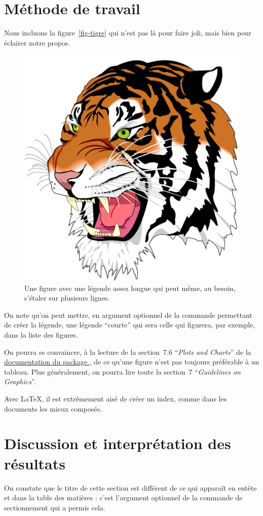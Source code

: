 \lipsum[3-22]
%
\section{Méthode de travail}
\label{sec-methode}
%
Nous incluons la figure~\vref{fig-tigre} qui n'est
pas là pour faire joli, mais bien pour éclairer notre propos.
\begin{figure}
  \centering
  \capstart
  \includegraphics[width=.35\linewidth]{images/tiger}
  \caption[Un tigre]{Une figure avec une légende assez longue qui peut
    même, au besoin, s'étaler sur plusieurs lignes.}
  \label{fig-tigre}
\end{figure}
On note qu'on peut mettre, en argument optionnel de la commande
permettant de créer la légende, une légende \enquote{courte} qui sera
celle qui figurera, par exemple, dans la liste des figures.

On pourra se convaincre, à la lecture de la section~7.6 \enquote{\emph{Plots and
    Charts}} de la \href{https://ctan.org/pkg/pgf/doc}{documentation du package
  }, de ce qu'une figure n'est pas
toujours préférable à un tableau. Plus généralement,
on pourra lire toute la section~7 \enquote{\emph{Guidelines on Graphics}}.

Avec \LaTeX{}, il est extrêmement aisé de créer
un index, comme dans les documents les mieux
composés.

\lipsum[23-42]
%
\section[Discussion]{Discussion et interprétation des résultats}
\label{sec-discussion}
%
On constate que le titre de cette section est différent de ce qui
apparaît en entête et dans la table des matières : c'est l'argument
optionnel de la commande de sectionnement qui a permis cela.

\lipsum[43-52]
